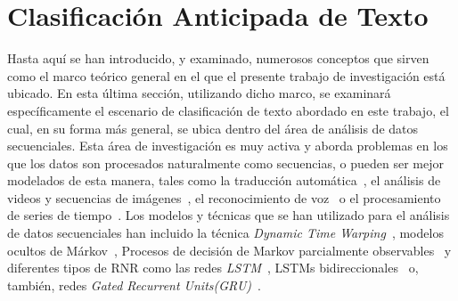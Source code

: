 \section{Clasificación Anticipada de Texto}
\label{sec:EC}

Hasta aquí se han introducido, y examinado, numerosos conceptos que sirven como el marco teórico general en el que el presente trabajo de investigación está ubicado.
En esta última sección, utilizando dicho marco, se examinará específicamente el escenario de clasificación de texto abordado en este trabajo, el cual, en su forma más general, se ubica dentro del área de análisis de datos secuenciales. %
Esta área de investigación es muy activa y aborda problemas en los que los datos son procesados naturalmente como secuencias, o pueden ser mejor modelados de esta manera, tales como la traducción automática~\citep{cho2014learning}, el análisis de videos y secuencias de imágenes~\citep{ullah2018action,srivastava2015unsupervised}, el reconocimiento de voz~\citep{graves2013speech} o el procesamiento de series de tiempo~\citep{kadous2002temporal}.
Los modelos y técnicas que se han utilizado para el análisis de datos secuenciales han incluido la técnica \emph{Dynamic Time Warping}~\citep{muller2007dynamic,sabinas2013one}, modelos ocultos de Márkov~\citep{yi2009hidden}, Procesos de decisión de Markov parcialmente observables~\citep{dulac2011text,rafferty2016faster} y diferentes tipos de \ac{RNR} como las redes \emph{\ac{LSTM}}~\citep{hochreiter1997long}, LSTMs bidireccionales~\citep{graves2005framewise} o, también, redes \emph{Gated Recurrent Units(GRU)}~\citep{chung2014empirical}.



